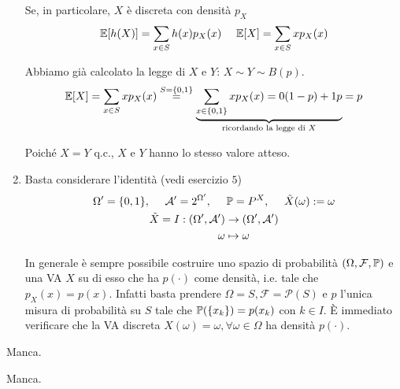 \begin{enumerate}
\begin{theorem}
Se, in particolare, $X$ è discreta con densità $p_{X}$\begin{equation*}
\mathbb{E}[ h( X)] =\sum\limits _{x\in S} h( x) p_{X}( x) \ \ \ \ \mathbb{E}[ X] =\sum\limits _{x\in S} xp_{X}( x)
\end{equation*}
\end{theorem}

Abbiamo già calcolato la legge di $X$ e $Y$: $X\sim Y\sim B( p)$.\begin{equation*}
\mathbb{E}[ X] =\sum\limits _{x\in S} xp_{X}( x)\overset{S=\{0,1\}}{=}\underbrace{\sum\limits _{x\in \{0,1\}} xp_{X}( x) =0( 1-p) +1p}_{\text{ricordando la legge di } X} =p
\end{equation*}

Poiché $X=Y$ q.c., $X$ e $Y$ hanno lo stesso valore atteso.
\item Basta considerare l'identità (vedi esercizio $5$)\begin{gather*}
\Omega '=\{0,1\} ,\ \ \ \ \mathcal{A} '=2^{\Omega '} ,\ \ \ \ \mathbb{P} =P^{X} ,\ \ \ \ \tilde{X}( \omega ) :=\omega \\
\begin{aligned}
\tilde{X} =I:( \Omega ',\mathcal{A} ') & \rightarrow ( \Omega ',\mathcal{A} ')\\
\omega  & \mapsto \omega 
\end{aligned}
\end{gather*}

\begin{oss}
In generale è sempre possibile costruire uno spazio di probabilità $( \Omega ,\mathcal{F} ,\mathbb{P})$ e una VA $X$ su di esso che ha $p( \cdotp )$ come densità, i.e. tale che $p_{X}( x) =p( x)$. Infatti basta prendere $\Omega =S,\mathcal{F} =\mathcal{P}( S)$ e $p$ l'unica misura di probabilità su $S$ tale che $\mathbb{P}(\{x_{k}\}) =p( x_{k})$ con $k\in I$. È immediato verificare che la VA discreta $X( \omega ) =\omega ,\forall \omega \in \Omega $ ha densità $p( \cdotp )$.
\end{oss}
\end{enumerate}
\Soluzione

Manca.
\Soluzione

Manca.
\Soluzione

